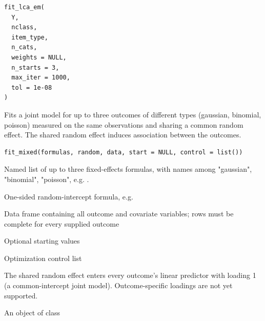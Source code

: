 \documentclass[a4paper]{book}
\begin{document}
%
\begin{Usage}
\begin{verbatim}
fit_lca_em(
  Y,
  nclass,
  item_type,
  n_cats,
  weights = NULL,
  n_starts = 3,
  max_iter = 1000,
  tol = 1e-08
)
\end{verbatim}
\end{Usage}
%
\begin{Description}
Fits a joint model for up to three outcomes of different types
(gaussian, binomial, poisson) measured on the same observations and
sharing a common random effect. The shared random effect induces
association between the outcomes.
\end{Description}
%
\begin{Usage}
\begin{verbatim}
fit_mixed(formulas, random, data, start = NULL, control = list())
\end{verbatim}
\end{Usage}
%
\begin{Arguments}
\begin{ldescription}
\item[\code{formulas}] Named list of up to three fixed-effects formulas, with
names among "gaussian", "binomial", "poisson", e.g.
.

\item[\code{random}] One-sided random-intercept formula, e.g. 

\item[\code{data}] Data frame containing all outcome and covariate variables;
rows must be complete for every supplied outcome

\item[\code{start}] Optional starting values

\item[\code{control}] Optimization control list
\end{ldescription}
\end{Arguments}
%
\begin{Details}
The shared random effect enters every outcome's linear predictor with
loading 1 (a common-intercept joint model). Outcome-specific loadings
are not yet supported.
\end{Details}
%
\begin{Value}
An object of class 
\end{Value}
\end{document}
